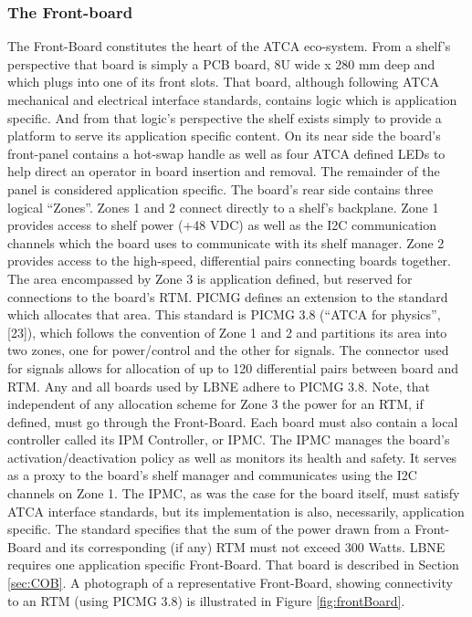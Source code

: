 \subsubsection{The Front-board}
\label{sec:frontboard}
The Front-Board constitutes the heart of the ATCA eco-system. From a shelf's perspective that board is simply a PCB board, 8U wide x 280 mm deep and which plugs into one of its front slots. That board, although following ATCA mechanical and electrical interface standards, contains logic which is application specific. And from that logic's perspective the shelf exists simply to provide a platform to serve its application specific content.
On its near side the board's front-panel contains a hot-swap handle as well as four ATCA defined LEDs to help direct an operator in board insertion and removal. The remainder of the panel is considered application specific. The board's rear side contains three logical “Zones”. Zones 1 and 2 connect directly to a shelf's backplane. Zone 1 provides access to shelf power (+48 VDC) as well as the I2C communication channels which the board uses to communicate with its shelf manager. Zone 2 provides access to the high-speed, differential pairs connecting boards together. The area encompassed by Zone 3 is application defined, but reserved for connections to the board's RTM. PICMG defines an extension to the standard which allocates
that area. This standard is PICMG 3.8 (“ATCA for physics”, [23]), which follows the convention of Zone 1 and 2 and partitions its area into two zones, one for power/control and the other for signals. The connector used for signals allows for allocation of up to 120 differential pairs between board and RTM.
Any and all boards used by LBNE adhere to PICMG 3.8.
Note, that independent of any allocation scheme for Zone 3 the power for an RTM, if defined, must go through the Front-Board.
Each board must also contain a local controller called its IPM Controller, or IPMC. The IPMC manages the board's activation/deactivation policy as well as monitors its health and safety. It serves as a proxy to the board's shelf manager and communicates using the I2C channels on Zone 1. The IPMC, as was the case for the board itself, must satisfy ATCA interface standards, but its implementation is also, necessarily, application specific.
The standard specifies that the sum of the power drawn from a Front-Board and its corresponding (if any) RTM must not exceed 300 Watts.
LBNE requires one application specific Front-Board. That board is described in Section \ref{sec:COB}.
A photograph of a representative Front-Board, showing connectivity to an RTM (using PICMG 3.8) is illustrated in Figure \ref{fig:frontBoard}.

